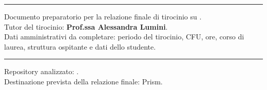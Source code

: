 \mbox{}
\vfill

{\small\onehalfspacing
\begin{center}

\noindent\rule{\textwidth}{1pt}

    Documento preparatorio per la relazione finale di tirocinio su \builder.\\
    Tutor del tirocinio: \textbf{Prof.ssa Alessandra Lumini}.\\
    Dati amministrativi da completare: periodo del tirocinio, CFU, ore, corso di laurea, struttura ospitante e dati dello studente.

\noindent\rule{\textwidth}{.2pt}

    Repository analizzato: .\\
    Destinazione prevista della relazione finale: Prism.

\end{center}
}
